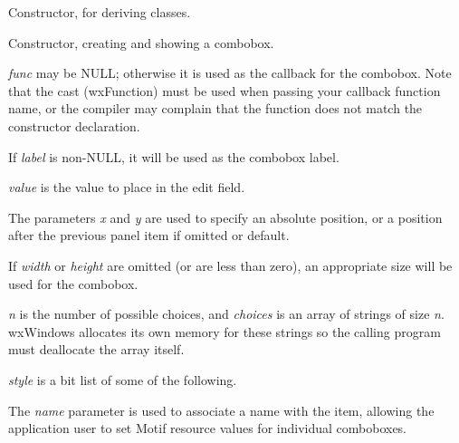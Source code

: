
Constructor, for deriving classes.


Constructor, creating and showing a combobox.

{\it func} may be NULL; otherwise it is used as the callback for the
combobox.  Note that the cast (wxFunction) must be used when passing
your callback function name, or the compiler may complain that the
function does not match the constructor declaration.

If {\it label} is non-NULL, it will be used as the combobox label.

{\it value} is the value to place in the edit field.

The parameters {\it x} and {\it y} are used to specify an absolute
position, or a position after the previous panel item if omitted or
default.

If {\it width} or {\it height} are omitted (or are less than zero), an
appropriate size will be used for the combobox.

{\it n} is the number of possible choices, and {\it choices} is an array of strings
of size {\it n}. wxWindows allocates its own memory for these strings so the
calling program must deallocate the array itself.

{\it style} is a bit list of some of the following.

\begin{twocollist}\itemsep=0pt
\end{twocollist}

The {\it name} parameter is used to associate a name with the item,
allowing the application user to set Motif resource values for
individual comboboxes.


